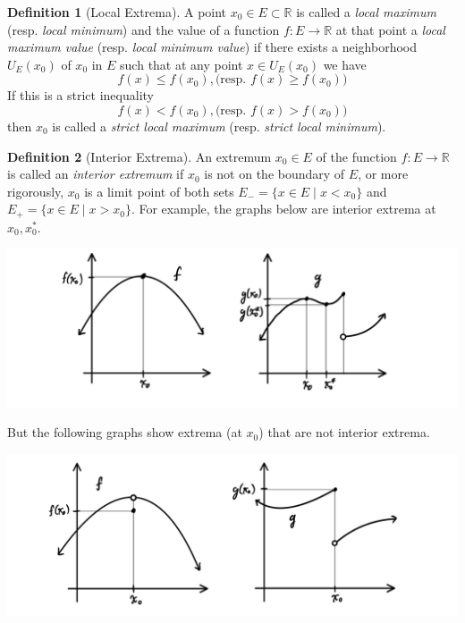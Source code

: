 \documentclass{article}
\theoremstyle{remark}
\theoremstyle{definition}
\newtheorem{definition}{Definition}[section]
\begin{document}
\begin{definition}[Local Extrema]
A point $x_0 \in E \subset \mathbb{R}$ is called a \textit{local maximum} (resp. \textit{local minimum}) and the value of a function $f: E \longrightarrow \mathbb{R}$ at that point a \textit{local maximum value} (resp. \textit{local minimum value}) if there exists a neighborhood $U_E (x_0)$ of $x_0$ in $E$ such that at any point $x \in U_E (x_0)$ we have 
\[f(x) \leq f(x_0), \big( \text{resp. } f(x) \geq f(x_0) \big)\]
If this is a strict inequality
\[f(x) < f(x_0), \big( \text{resp. } f(x) > f(x_0) \big)\]
then $x_0$ is called a \textit{strict local maximum} (resp. \textit{strict local minimum}). 
\end{definition}

\begin{definition}[Interior Extrema]
An extremum $x_0 \in E$ of the function $f: E \longrightarrow \mathbb{R}$ is called an \textit{interior extremum} if $x_0$ is not on the boundary of $E$, or more rigorously, $x_0$ is a limit point of both sets $E_- = \{x \in E \;|\; x < x_0\}$ and $E_+ = \{ x\in E\;|\; x > x_0\}$. For example, the graphs below are interior extrema at $x_0, x_0^*$. 
\begin{center}
    \includegraphics[scale=0.3]{img/Interior_Extrema.PNG}
\end{center}
But the following graphs show extrema (at $x_0$) that are not interior extrema. 
\begin{center}
    \includegraphics[scale=0.3]{img/Non_Interior_Extrema.PNG}
\end{center}
\end{definition}
\end{document}
